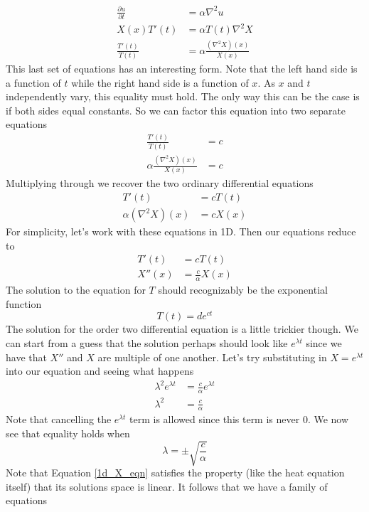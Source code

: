 \documentclass[book.tex]{subfiles}
\begin{document}
\begin{align}
    \frac{\partial u}{\partial t} &= \alpha \nabla^2 u \\
    X(x) T'(t) &= \alpha T(t) \nabla^2 X \\
    \frac{T'(t)}{T(t)} &= \alpha \frac{(\nabla^2 X)(x)}{X(x)}
\end{align}
This last set of equations has an interesting form. Note that the left hand side is a function of $t$ while the right hand side is a function of $x$. As $x$ and $t$ independently vary, this equality must hold. The only way this can be the case is if both sides equal constants. So we can factor this equation into two separate equations
\begin{align}
    \frac{T'(t)}{T(t)} &= c \\
    \alpha \frac{(\nabla^2 X)(x)}{X(x)} &= c
\end{align}
Multiplying through we recover the two ordinary differential equations
\begin{align}
    T'(t) &= cT(t) \\
    \alpha (\nabla^2 X)(x) &= cX(x) 
\end{align}
For simplicity, let's work with these equations in 1D. Then our equations reduce to
\begin{align}
    T'(t) &= cT(t) \\
    X''(x) &= \frac{c}{\alpha}X(x) \label{1d_X_eqn}
\end{align}
The solution to the equation for $T$ should recognizably be the exponential function
\begin{equation}
    T(t) = d e^{ct}
    \label{1d_X_soln}
\end{equation}
The solution for the order two differential equation is a little trickier though. We can start from a guess that the solution perhaps should look like $e^{\lambda t}$ since we have that $X''$ and $X$ are multiple of one another. Let's try substituting in $X = e^{\lambda t}$ into our equation and seeing what happens
\begin{align}
    \lambda^2 e^{\lambda t} &= \frac{c}{\alpha} e^{\lambda t} \\
    \lambda^2 &= \frac{c}{\alpha}
\end{align}
Note that cancelling the $e^{\lambda t}$ term is allowed since this term is never 0. We now see that equality holds when
\begin{equation}
    \lambda = \pm \sqrt{\frac{c}{\alpha}}
\end{equation}
Note that Equation \ref{1d_X_eqn} satisfies the property (like the heat equation itself) that its solutions space is linear. It follows that we have a family of equations
\end{document}
